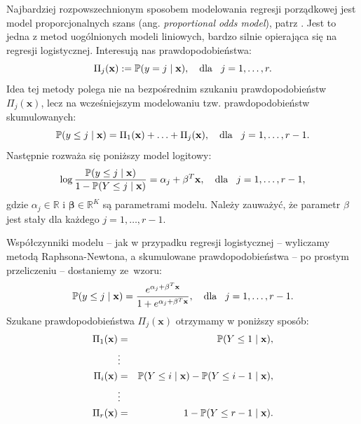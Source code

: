 \documentclass{mini}
\begin{document}
Najbardziej rozpowszechnionym sposobem modelowania regresji porządkowej jest model proporcjonalnych szans (ang. \textit{proportional odds model}), patrz \cite{pom}. Jest to jedna z metod uogólnionych modeli liniowych, bardzo silnie opierająca się na regresji logistycznej. Interesują nas prawdopodobieństwa: 
$$
\Pi_j(\mathbf{x}):=\mathbb{P}(y=j\hspace{1mm}|\hspace{1mm}\mathbf{x}),\quad \textrm{dla}\hspace{3mm} j=1,\ldots,r.
$$
Idea tej metody polega nie na bezpośrednim szukaniu prawdopodobieństw $\Pi_j(\mathbf{x})$, lecz na wcześniejszym modelowaniu tzw. prawdopodobieństw skumulowanych:
$$
\mathbb{P}(y\leq j \hspace{1mm}|\hspace{1mm} \mathbf{x})=\Pi_1(\mathbf{x})+\ldots+\Pi_j(\mathbf{x}),\quad \textrm{dla}\hspace{3mm} j=1,\ldots,r-1.
$$
Następnie rozważa się poniższy model logitowy:
$$
\log\dfrac{\mathbb{P}(y\leq j \hspace{1mm}|\hspace{1mm} \mathbf{x})}{1 - \mathbb{P}(Y\leq j \hspace{1mm}|\hspace{1mm} \mathbf{x})} = \alpha_j+\mathbf{\beta}^T\mathbf{x},\quad \textrm{dla}\hspace{3mm} j=1,\ldots,r-1,
$$
gdzie $\alpha_j\in \mathbb{R}$ i $\mathbf{\beta}\in \mathbb{R}^K$ są parametrami modelu. Należy zauważyć, że parametr $\beta$ jest stały dla każdego $j=1, \ldots, r-1$.

Współczynniki modelu -- jak w przypadku regresji logistycznej -- wyliczamy metodą Raphsona-Newtona, a skumulowane prawdopodobieństwa -- po prostym przeliczeniu -- dostaniemy ze~wzoru:
$$
\mathbb{P}(y\leq j \hspace{1mm}|\hspace{1mm} \mathbf{x})=\dfrac{e^{\alpha_j+\mathbf{\beta}^T\mathbf{x}}}{1+e^{\alpha_j+\mathbf{\beta}^T\mathbf{x}}},\quad \textrm{dla}\hspace{3mm} j=1,\ldots,r-1.
$$ 
Szukane prawdopodobieństwa $\Pi_j(\mathbf{x})$ otrzymamy w poniższy sposób:
\begin{eqnarray*}
\Pi_1(\mathbf{x}) &=& \mathbb{P}(Y\leq 1 \hspace{1mm}|\hspace{1mm}\mathbf{x}),\\
&\vdots&\\
\Pi_i(\mathbf{x}) &=& \mathbb{P}(Y\leq i \hspace{1mm}|\hspace{1mm} \mathbf{x}) - \mathbb{P}(Y\leq i-1 \hspace{1mm}|\hspace{1mm} \mathbf{x}),\\
&\vdots&\\
\Pi_r(\mathbf{x}) &=& 1 - \mathbb{P}(Y\leq r-1 \hspace{1mm}|\hspace{1mm} \mathbf{x}).
\end{eqnarray*}
\end{document}
